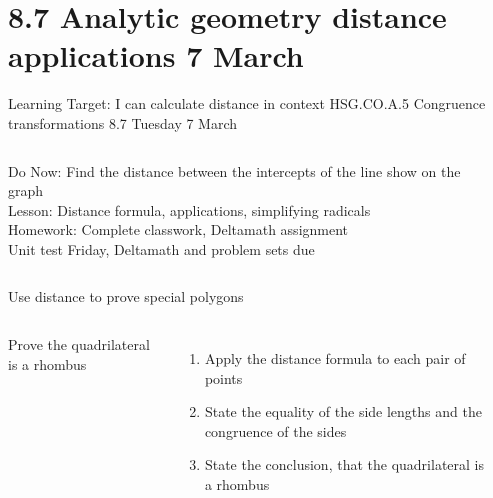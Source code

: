 \section{8.7 Analytic geometry distance applications \hfill 7 March \,}
\begin{frame}{Learning Target: I can calculate distance in context}
  {HSG.CO.A.5 Congruence transformations \hfill \alert{8.7 Tuesday 7 March}}
  \begin{columns}
    Do Now: Find the distance between the intercepts of the line show on the graph \\[0.5cm]
    Lesson: Distance formula, applications, simplifying radicals \\
    Homework: Complete classwork, Deltamath assignment \\[0.5cm]
    \alert{Unit test Friday}, Deltamath and problem sets due
    \begin{flushright}
    \end{flushright}
  \end{columns}
\end{frame}

\begin{frame}{Use distance to prove special polygons}
  \begin{columns}
    Prove the quadrilateral is a rhombus
    \begin{enumerate}
      \item Apply the distance formula to each pair of points
      \item State the equality of the side lengths and the congruence of the sides
      \item State the conclusion, that the quadrilateral is a rhombus
    \end{enumerate}
    \begin{flushright}
    \end{flushright}
  \end{columns}
\end{frame}

